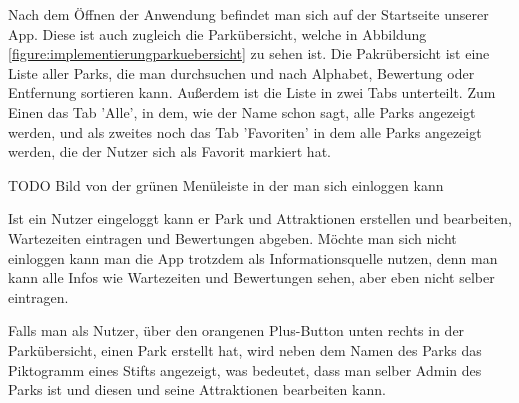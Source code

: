 Nach dem Öffnen der Anwendung befindet man sich auf der Startseite unserer App. Diese ist auch zugleich die Parkübersicht, welche in Abbildung \ref{figure:implementierungparkuebersicht} zu sehen ist. Die Pakrübersicht ist eine Liste aller Parks, die man durchsuchen und nach Alphabet, Bewertung oder Entfernung sortieren kann. Außerdem ist die Liste in zwei Tabs unterteilt. Zum Einen das Tab 'Alle', in dem, wie der Name schon sagt, alle Parks angezeigt werden, und als zweites noch das Tab 'Favoriten' in dem alle Parks angezeigt werden, die der Nutzer sich als Favorit markiert hat. 

TODO Bild von der grünen Menüleiste in der man sich einloggen kann

Ist ein Nutzer eingeloggt kann er Park und Attraktionen erstellen und bearbeiten, Wartezeiten eintragen und Bewertungen abgeben. Möchte man sich nicht einloggen kann man die App trotzdem als Informationsquelle nutzen, denn man kann alle Infos wie Wartezeiten und Bewertungen sehen, aber eben nicht selber eintragen. 

Falls man als Nutzer, über den orangenen Plus-Button unten rechts in der Parkübersicht, einen Park erstellt hat, wird neben dem Namen des Parks das Piktogramm eines Stifts angezeigt, was bedeutet, dass man selber Admin des Parks ist und diesen und seine Attraktionen bearbeiten kann. \\

